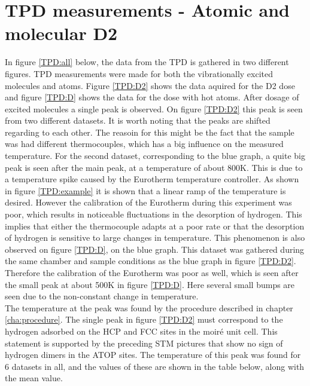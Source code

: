 \section{TPD measurements - Atomic and molecular D2}

In figure \ref{TPD:all} below, the data from the TPD is gathered in two different figures. TPD measurements were made for both the vibrationally excited molecules and atoms. Figure \ref{TPD:D2} shows the data aquired for the D2 dose and figure \ref{TPD:D} shows the data for the dose with hot atoms. After dosage of excited molecules a single peak is observed. On figure \ref{TPD:D2} this peak is seen from two different datasets. It is worth noting that the peaks are shifted regarding to each other. The reasoin for this might be the fact that the sample was had different thermocouples, which has a big influence on the measured temperature. For the second dataset, corresponding to the blue graph, a quite big peak is seen after the main peak, at a temperature of about 800K. This is due to a temperature spike caused by the Eurotherm temperature controller. As shown in figure \ref{TPD:example} it is shown that a linear ramp of the temperature is desired. However the calibration of the Eurotherm during this experiment was poor, which results in noticeable fluctuations in the desorption of hydrogen. This implies that either the thermocouple adapts at a poor rate or that the desorption of hydrogen is sensitive to large changes in temperature. This phenomenon is also observed on figure \ref{TPD:D}, on the blue graph. This dataset was gathered during the same chamber and sample conditions as the blue graph in figure \ref{TPD:D2}. Therefore the calibration of the Eurotherm was poor as well, which is seen after the small peak at about 500K in figure \ref{TPD:D}. Here several small bumps are seen due to the non-constant change in temperature.\\
The temperature at the peak was found by the procedure described in chapter \ref{cha:procedure}. The single peak in figure \ref{TPD:D2} must correspond to the hydrogen adsorbed on the HCP and FCC sites in the moiré unit cell. This statement is supported by the preceding STM pictures that show no sign of hydrogen dimers in the ATOP sites. The temperature of this peak was found for 6 datasets in all, and the values of these are shown in the table below, along with the mean value.\\
\begin{table}
  \centering
\end{table}
